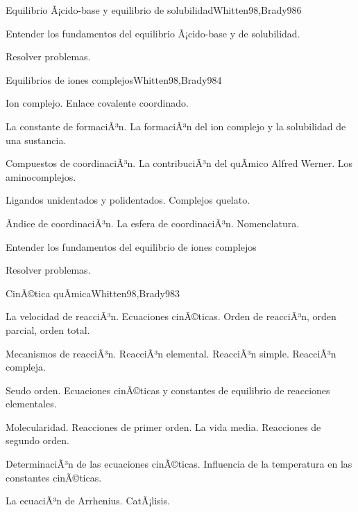 \begin{syllabus}
\begin{unit}{Equilibrio Ã¡cido-base y equilibrio de solubilidad}{Whitten98,Brady98}{6}
\begin{unitgoals}
	\item Entender los fundamentos del equilibrio Ã¡cido-base y de solubilidad.
	\item Resolver problemas.
\end{unitgoals}
\end{unit}

\begin{unit}{Equilibrios de iones complejos}{Whitten98,Brady98}{4}
\begin{topics}
	\item Ion complejo. Enlace covalente coordinado.
	\item La constante de formaciÃ³n. La formaciÃ³n del ion complejo y la solubilidad de una sustancia.
	\item Compuestos de coordinaciÃ³n. La contribuciÃ³n del quÃ­mico Alfred Werner. Los aminocomplejos.
	\item Ligandos unidentados y polidentados. Complejos quelato.
	\item Ãndice de coordinaciÃ³n. La esfera de coordinaciÃ³n. Nomenclatura.
   \end{topics}

   \begin{unitgoals}
      \item Entender los fundamentos del equilibrio de iones complejos
      \item Resolver problemas.
   \end{unitgoals}
\end{unit}

\begin{unit}{CinÃ©tica quÃ­mica}{Whitten98,Brady98}{3}
\begin{topics}
      \item La velocidad de  reacciÃ³n. Ecuaciones cinÃ©ticas. Orden de reacciÃ³n, orden parcial, orden total.
      \item Mecanismos de reacciÃ³n. ReacciÃ³n elemental. ReacciÃ³n simple. ReacciÃ³n compleja.
	\item Seudo orden. Ecuaciones cinÃ©ticas y constantes de equilibrio de reacciones elementales.
	\item Molecularidad. Reacciones de primer orden. La vida media. Reacciones de segundo orden.
	\item DeterminaciÃ³n de las ecuaciones cinÃ©ticas. Influencia de la temperatura en las constantes cinÃ©ticas.
	\item La ecuaciÃ³n de Arrhenius. CatÃ¡lisis.
  \end{topics}


\end{unit}
\end{syllabus}
